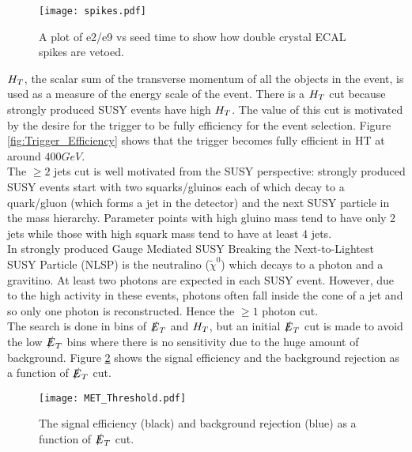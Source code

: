 \begin{figure}
\begin{center}
\texttt{[image: spikes.pdf]}
\end{center}
\caption{A plot of e2/e9 vs seed time to show how double crystal ECAL spikes are
vetoed.}
\label{fig:spikes}
\end{figure}

$H_{T}$, the scalar sum of the transverse momentum of all the objects in the 
event, is used as a measure of the energy scale of the event. There is a $H_{T}$ 
cut because strongly produced SUSY events have high $H_{T}$. The value of this cut
is motivated by the desire for the trigger to be fully efficiency for the event
selection. Figure \ref{fig:Trigger_Efficiency} shows that the trigger becomes
fully efficient in HT at around $400\unit{GeV}$. \\

The $\geq 2$ jets cut is well motivated from the SUSY perspective: strongly
produced SUSY events start with two squarks/gluinos each of which decay to a 
quark/gluon (which forms a jet in the detector) and the next SUSY particle in 
the mass hierarchy. Parameter points with high gluino mass tend to have only 2 
jets while those with high squark mass tend to have at least 4 jets. \\

In strongly produced Gauge Mediated SUSY Breaking the Next-to-Lightest SUSY 
Particle (NLSP) is the neutralino ($\tilde{\chi}^{0}$) which decays to a photon 
and a gravitino. At least two photons are expected in each SUSY event. However, 
due to the high activity in these events, photons often fall inside the cone of
a jet and so only one photon is reconstructed. Hence the $\geq 1$ photon cut. \\

The search is done in bins of $\slashed{E}_{T}$ and $H_{T}$, but an initial $\slashed{E}_{T}$ cut is
made to avoid the low $\slashed{E}_{T}$ bins where there is no sensitivity due to the huge
amount of background. Figure \ref{fig:met_threshold} shows the signal efficiency
and the background rejection as a function of $\slashed{E}_{T}$ cut.

\begin{figure}
\begin{center}
\texttt{[image: MET\_Threshold.pdf]}
\end{center}
\caption{The signal efficiency (black) and background rejection (blue) as a
function of $\slashed{E}_{T}$ cut.}
\label{fig:met_threshold}
\end{figure}
